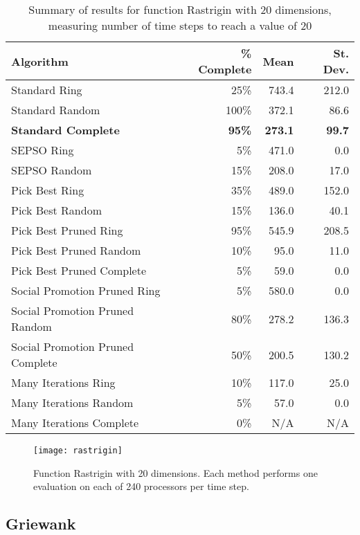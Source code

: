 \documentclass[ms,electronic,twosidetoc,letterpaper,chaptercenter,parttop,equalmargins]{byumsphd}
\begin{document}
\begin{table}
  \caption{Summary of results for function Rastrigin with 20 dimensions,
  measuring number of time steps to reach a value of 20}
  \label{tab:rastrigin-20}
  \centering
  \begin{tabular}{|l|r|r|r|}
  \hline
  Algorithm&\% Complete&Mean&St. Dev.\\
  \hline
  \hline
  Standard Ring&25\%&743.4&212.0\\
  \hline
  Standard Random&100\%&372.1&86.6\\
  \hline
  \textbf{Standard Complete}&\textbf{95\%}&\textbf{273.1}&\textbf{99.7}\\
  \hline
  SEPSO Ring&5\%&471.0&0.0\\
  \hline
  SEPSO Random&15\%&208.0&17.0\\
  \hline
  Pick Best Ring&35\%&489.0&152.0\\
  \hline
  Pick Best Random&15\%&136.0&40.1\\
  \hline
  Pick Best Pruned Ring&95\%&545.9&208.5\\
  \hline
  Pick Best Pruned Random&10\%&95.0&11.0\\
  \hline
  Pick Best Pruned Complete&5\%&59.0&0.0\\
  \hline
  Social Promotion Pruned Ring&5\%&580.0&0.0\\
  \hline
  Social Promotion Pruned Random&80\%&278.2&136.3\\
  \hline
  Social Promotion Pruned Complete&50\%&200.5&130.2\\
  \hline
  Many Iterations Ring&10\%&117.0&25.0\\
  \hline
  Many Iterations Random&5\%&57.0&0.0\\
  \hline
  Many Iterations Complete&0\%&N/A&N/A\\
  \hline
  \end{tabular}
\end{table}


\begin{figure}
  \centering
  \texttt{[image: rastrigin]}
  \caption{Function Rastrigin with 20 dimensions.  Each method performs one
  evaluation on each of 240 processors per time step.}
  \label{fig:rastrigin}
\end{figure}

\subsection{Griewank}
\label{sec:griewank-20}
\end{document}
